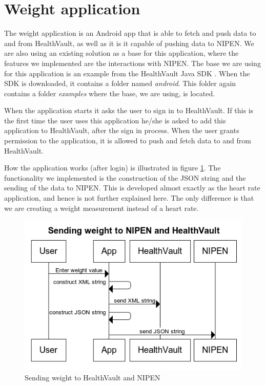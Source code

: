 \section{Weight application}

The weight application is an Android app that is able to fetch and push data to and from HealthVault, as well as
it is it capable of pushing data to NIPEN.
We are also using an existing solution as a base for this application, where the features we implemented are
the interactions with NIPEN.
The base we are using for this application is an example from the HealthVault Java SDK \cite{HealthVaultSDK}.
When the SDK is downloaded, it contains a folder named \textit{android}. 
This folder again contains a folder \textit{examples} where the base, we are using, is located.

When the application starts it asks the user to sign in to HealthVault.
If this is the first time the user uses this application he/she is asked to add this application to HealthVault,
after the sign in process.
When the user grants permission to the application, it is allowed to push and fetch data to and from HealthVault.

How the application works (after login) is illustrated in figure \ref{figure:sending-weight-to-healthvault-and-nipen}.
The functionality we implemented is the construction of the JSON string and the sending of the data to NIPEN.
This is developed almost exactly as the heart rate application, and hence is not further explained here.
The only difference is that we are creating a weight measurement instead of a heart rate.

\begin{figure}[h]
\centering
\includegraphics[scale=1.0]{../Figures/sending-weight-to-healthvault-and-nipen.png}
\caption{Sending weight to HealthVault and NIPEN}
\label{figure:sending-weight-to-healthvault-and-nipen}
\end{figure}

